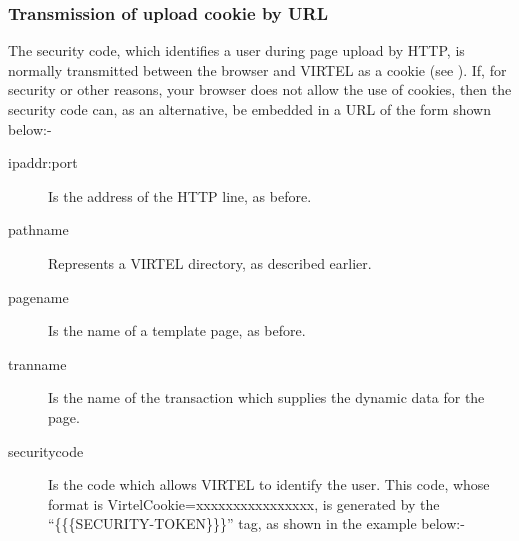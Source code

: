 \documentclass[letterpaper,10pt,english]{sphinxmanual}
\begin{document}
\subsubsection{Transmission of upload cookie by URL}
\label{\detokenize{User_Guide:transmission-of-upload-cookie-by-url}}\label{\detokenize{User_Guide:v457ug-cookie-upload}}
The security code, which identifies a user during page upload by HTTP, is normally transmitted between the browser and VIRTEL as a cookie (see {\hyperref[\detokenize{User_Guide:v457ug-uploading-html-pages}]{}}). If, for security or other reasons, your browser does not allow the use of cookies, then the security code can, as an alternative, be embedded in a URL of the form shown below:-

\begin{sphinxVerbatim}[commandchars=\\\{\}]
\end{sphinxVerbatim}
\begin{description}
\item[{ipaddr:port}] \leavevmode
Is the address of the HTTP line, as before.

\item[{pathname}] \leavevmode
Represents a VIRTEL directory, as described earlier.

\item[{pagename}] \leavevmode
Is the name of a template page, as before.

\item[{tranname}] \leavevmode
Is the name of the transaction which supplies the dynamic data for the page.

\item[{securitycode}] \leavevmode
Is the code which allows VIRTEL to identify the user. This code, whose format is VirtelCookie=xxxxxxxxxxxxxxxx, is generated by the “\{\{\{SECURITY-TOKEN\}\}\}” tag, as shown in the example below:-

\end{description}

\begin{sphinxVerbatim}[commandchars=\\\{\}]
\end{sphinxVerbatim}
\end{document}
